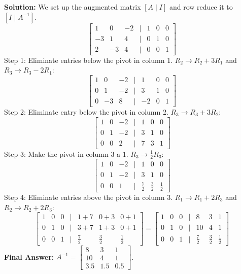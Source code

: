 \documentclass[12pt]{article}
\begin{document}
\textbf{Solution:}
We set up the augmented matrix $[A \mid I]$ and row reduce it to $[I \mid A^{-1}]$.
\[ \begin{bmatrix} 1 & 0 & -2 & \mid & 1 & 0 & 0 \\ -3 & 1 & 4 & \mid & 0 & 1 & 0 \\ 2 & -3 & 4 & \mid & 0 & 0 & 1 \end{bmatrix} \]
Step 1: Eliminate entries below the pivot in column 1.
$R_2 \to R_2 + 3R_1$ and $R_3 \to R_3 - 2R_1$:
\[ \begin{bmatrix} 1 & 0 & -2 & \mid & 1 & 0 & 0 \\ 0 & 1 & -2 & \mid & 3 & 1 & 0 \\ 0 & -3 & 8 & \mid & -2 & 0 & 1 \end{bmatrix} \]
Step 2: Eliminate entry below the pivot in column 2.
$R_3 \to R_3 + 3R_2$:
\[ \begin{bmatrix} 1 & 0 & -2 & \mid & 1 & 0 & 0 \\ 0 & 1 & -2 & \mid & 3 & 1 & 0 \\ 0 & 0 & 2 & \mid & 7 & 3 & 1 \end{bmatrix} \]
Step 3: Make the pivot in column 3 a $1$.
$R_3 \to \frac{1}{2}R_3$:
\[ \begin{bmatrix} 1 & 0 & -2 & \mid & 1 & 0 & 0 \\ 0 & 1 & -2 & \mid & 3 & 1 & 0 \\ 0 & 0 & 1 & \mid & \frac{7}{2} & \frac{3}{2} & \frac{1}{2} \end{bmatrix} \]
Step 4: Eliminate entries above the pivot in column 3.
$R_1 \to R_1 + 2R_3$ and $R_2 \to R_2 + 2R_3$:
\[ \begin{bmatrix} 1 & 0 & 0 & \mid & 1+7 & 0+3 & 0+1 \\ 0 & 1 & 0 & \mid & 3+7 & 1+3 & 0+1 \\ 0 & 0 & 1 & \mid & \frac{7}{2} & \frac{3}{2} & \frac{1}{2} \end{bmatrix} = \begin{bmatrix} 1 & 0 & 0 & \mid & 8 & 3 & 1 \\ 0 & 1 & 0 & \mid & 10 & 4 & 1 \\ 0 & 0 & 1 & \mid & \frac{7}{2} & \frac{3}{2} & \frac{1}{2} \end{bmatrix} \]
\textbf{Final Answer:} $A^{-1} = \begin{bmatrix} 8 & 3 & 1 \\ 10 & 4 & 1 \\ 3.5 & 1.5 & 0.5 \end{bmatrix}$.
\end{document}
